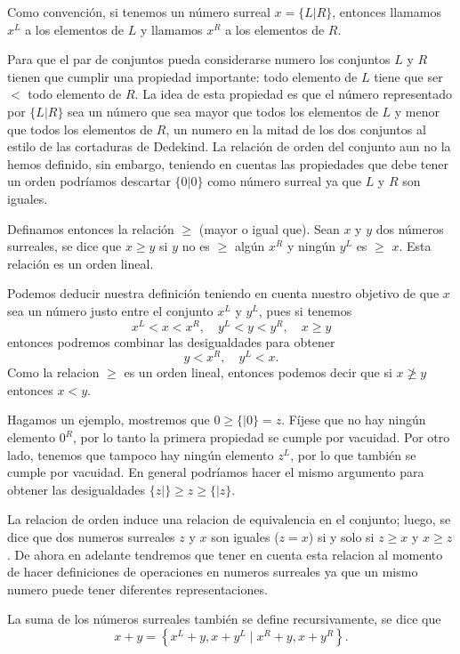     
    Como convención, si tenemos un número surreal $x=\{L|R\}$, entonces llamamos $x^L$ a los elementos de $L$ y llamamos $x^R$ a los elementos de $R$.
    
    Para que el par de conjuntos pueda considerarse numero los conjuntos $L$ y $R$ tienen que cumplir una propiedad importante: todo elemento de $L$ tiene que ser $<$ todo elemento de $R$. La idea de esta propiedad es que el número representado por $\{L|R\}$ sea un número que sea mayor que todos los elementos de $L$ y menor que todos los elementos de $R$, un numero en la mitad de los dos conjuntos al estilo de las cortaduras de Dedekind. La relación de orden del conjunto aun no la hemos definido, sin embargo, teniendo en cuentas las propiedades que debe tener un orden podríamos descartar $\{0|0\}$ como número surreal ya que $L$ y $R$ son iguales. 
    
    Definamos entonces la relación $\ge$ (mayor o igual que). Sean $x$ y $y$ dos números surreales, se dice que $x\ge y$ si $y$ no es $\ge$ algún $x^R$ y ningún $y^L$ es $\ge$ $x$. Esta relación es un orden lineal.
    
    Podemos deducir nuestra definición teniendo en cuenta nuestro objetivo de que $x$ sea un número justo entre el conjunto $x^L$ y $y^L$, pues si tenemos
    \[
        x^L < x < x^R,\quad y^L < y < y^R,\quad x \ge y
    \]
    entonces podremos combinar las desigualdades para obtener
    \[
        y < x^R,\quad y^L < x.
    \]
    Como la relacion $\ge$ es un orden lineal, entonces podemos decir que si $x\not\ge y$ entonces $x < y$.
    
    Hagamos un ejemplo, mostremos que $0\ge\{|0\}=z$. Fíjese que no hay ningún elemento $0^R$, por lo tanto la primera propiedad se cumple por vacuidad. Por otro lado, tenemos que tampoco hay ningún elemento $z^L$, por lo que también se cumple por vacuidad. En general podríamos hacer el mismo argumento para obtener las desigualdades $\{z|\}\ge z\ge\{|z\}$.

    La relacion de orden induce una relacion de equivalencia en el conjunto; luego, se dice que dos numeros surreales $z$ y $x$ son iguales ($z=x$) si y solo si $z\ge x$ y $x\ge z$. De ahora en adelante tendremos que tener en cuenta esta relacion al momento de hacer definiciones de operaciones en numeros surreales ya que un mismo numero puede tener diferentes representaciones.

    La suma de los números surreales también se define recursivamente, se dice que
    \[
        x + y  = \left\{x^L+y, x+y^L\;|\;x^R+y, x+y^R\right\}.
    \]

